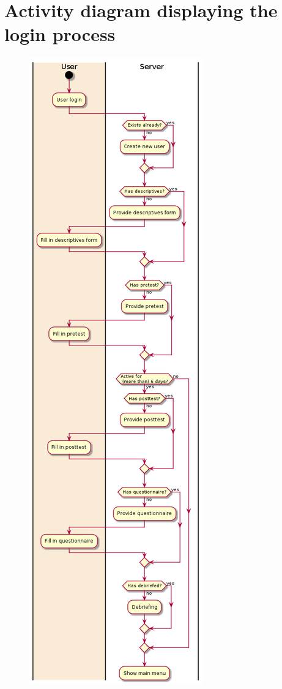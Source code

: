 \chapter{Activity diagram displaying the login process}
\label{app:loginactivity}
\begin{figure}[h!]
\centering
\includegraphics[height=\textheight]{img/loginactivity.png}
\end{figure}
